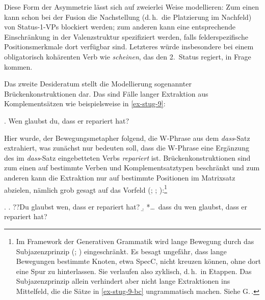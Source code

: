 Diese Form der Asymmetrie lässt sich auf zweierlei Weise modellieren: Zum einen kann schon bei der Fusion die Nachstellung (d.\,h.\ die Platzierung im Nachfeld) von Status-1-VPs blockiert werden; zum anderen kann eine entsprechende Einschränkung in der Valenzstruktur spezifiziert werden, falls felderspezifische \clearpage Positionsmerkmale dort verfügbar sind. Letzteres würde insbesondere bei einem obligatorisch kohärenten Verb wie {\it scheinen}, das den 2.~Status regiert, in Frage kommen.


Das zweite Desideratum stellt die Modellierung sogenannter Brückenkonstruktionen dar. Das sind  Fälle langer Extraktion aus Komplementsätzen wie beispielsweise in \ref{ex-stug-9}: 

\ex. \label{ex-stug-9} Wen glaubst du, dass er repariert hat?

Hier wurde, der Bewegungsmetapher folgend, die W-Phrase aus dem \textit{dass}-Satz extrahiert, was zunächst nur bedeuten soll, dass die W-Phrase eine Ergänzung des im \emph{dass}-Satz eingebetteten Verbs {\it repariert} ist. Brückenkonstruktionen sind zum einen auf bestimmte Verben und Komplementsatztypen beschränkt und zum anderen kann die Extraktion nur auf bestimmte Positionen im Matrixsatz abzielen, nämlich grob gesagt auf das Vorfeld (\citealt[Abschnitt~4.2.1.2]{Kvam:83}; \citealt{Luehr:88}; \citealt[Abschnitt~1.2]{Lutz:04}):\footnote{Im Framework der Generativen Grammatik wird lange Bewegung durch das Subjazenzprinzip (\citealt{Chomsky:73}; \citealt[Chapter~6]{Chomsky:86}) eingeschränkt. Es besagt ungefähr, dass lange Bewegungen bestimmte Knoten, etwa SpecC, nicht kreuzen können, ohne dort eine Spur zu hinterlassen. Sie verlaufen also zyklisch, d.\,h.\ in Etappen. Das Subjazenzprinzip allein verhindert aber  nicht lange Extraktionen ins Mittelfeld, die die Sätze in \ref{ex-stug-9-bc} ungrammatisch machen. Siehe G.\,\cite{Mueller:Sternefeld:93}.}

\ex. \label{ex-stug-9-bc}
\a. ??Du glaubst wen, dass er repariert hat?\label{ex-stug-9-b} 
\b. *\ldots\ dass du wen glaubst, dass er repariert hat?\label{ex-stug-9-c} 

